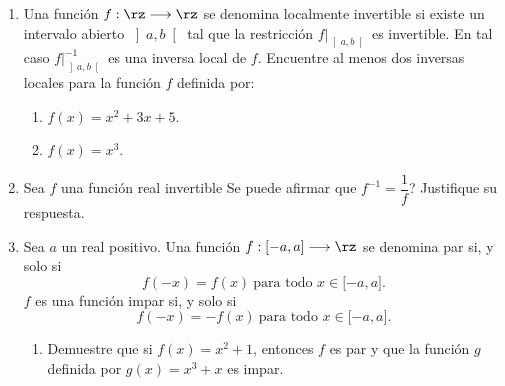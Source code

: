 \begin{enumerate}
\begin{enumerate}
\item La funci\'{o}n de variable real $f$ definida por:

\begin{enumerate}
\item $f(x)=5x-7$.

\item $f(x)=6$.

\item $f(x)=x$.

\item $f(x)=ax+b$, donde $a,b\in\rz$.

\item $f(x)=x^{2}-x-30$.

\item $f(x)=ax^{2}+bx+c$, donde $a,b$ y $c$ son reales cualesquiera con
$a\neq0$.

\item $f(x)=\sqrt{x}$.

\item $f(x)=x^{3}$.
\end{enumerate}
\end{enumerate}

\item Una funci\'{o}n $f:\rz\longrightarrow\rz$ se denomina localmente
invertible si existe un intervalo abierto $\left]  a,b\right[  $ tal que la
restricci\'{o}n $f|_{\left]  a,b\right[  }$ es invertible. En tal caso
$f|_{\left]  a,b\right[  }^{-1}$ es una inversa local de $f$. Encuentre al
menos dos inversas locales para la funci\'{o}n $f$ definida por:

\begin{enumerate}
\item $f(x)=x^{2}+3x+5$.

\item $f(x)=x^{3}$.
\end{enumerate}

\item Sea $f$ una funci\'{o}n real invertible \textquestiondown Se puede
afirmar que $f^{-1}=\dfrac{1}{f}$? Justifique su respuesta.

\item Sea $a$ un real positivo. Una funci\'{o}n $f:[-a,a]\longrightarrow\rz$
se denomina%
par si, y solo si
\[
f(-x)=f(x)\ \mbox{para todo \ }x\in\lbrack-a,a].
\]
$f$ es una funci\'{o}n impar%
si, y solo si
\[
f(-x)=-f(x)\ \mbox{para todo \ }x\in\lbrack-a,a].
\]


\begin{enumerate}
\item Demuestre que si $f(x)=x^{2}+1$, entonces $f$ es par y que la
funci\'{o}n $g$ definida por $g(x)=x^{3}+x$ es impar.


\end{enumerate}
\end{enumerate}
